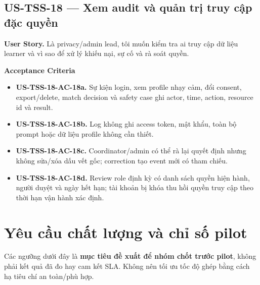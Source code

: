 \documentclass[11pt,a4paper]{article}
\newcommand{\ac}[1]{\textbf{\currentstory-AC-#1.}}
\newcommand{\storytitle}[2]{\subsection{#1 — #2}\def\currentstory{#1}}
\newcommand{\story}[1]{\textbf{User Story.} #1\par}
\newcommand{\acceptance}{\textbf{Acceptance Criteria}\par}
\begin{document}
\storytitle{US-TSS-18}{Xem audit và quản trị truy cập đặc quyền}
\story{Là privacy/admin lead, tôi muốn kiểm tra ai truy cập dữ liệu learner và vì sao để xử lý khiếu nại, sự cố và rà soát quyền.}
\acceptance
\begin{itemize}
  \item \ac{18a} Sự kiện login, xem profile nhạy cảm, đổi consent, export/delete, match decision và safety case ghi actor, time, action, resource id và result.
  \item \ac{18b} Log không ghi access token, mật khẩu, toàn bộ prompt hoặc dữ liệu profile không cần thiết.
  \item \ac{18c} Coordinator/admin có thể rà lại quyết định nhưng không sửa/xóa dấu vết gốc; correction tạo event mới có tham chiếu.
  \item \ac{18d} Review role định kỳ có danh sách quyền hiện hành, người duyệt và ngày hết hạn; tài khoản bị khóa thu hồi quyền truy cập theo thời hạn vận hành xác định.
\end{itemize}

\section{Yêu cầu chất lượng và chỉ số pilot}

Các ngưỡng dưới đây là \textbf{mục tiêu đề xuất để nhóm chốt trước pilot}, không phải kết quả đã đo hay cam kết SLA. Không nên tối ưu tốc độ ghép bằng cách hạ tiêu chí an toàn/phù hợp.
\end{document}
